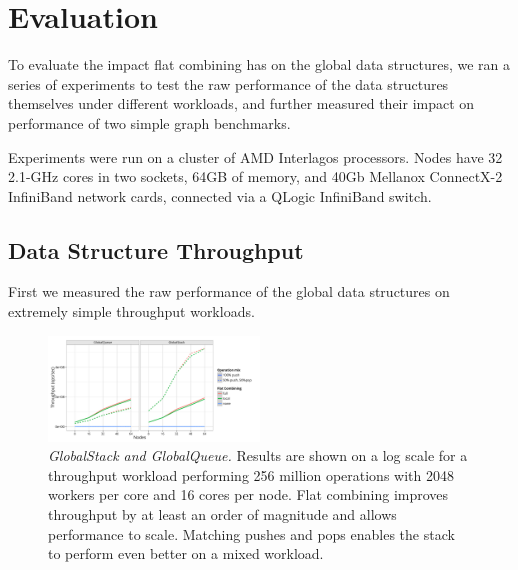 \section{Evaluation}
To evaluate the impact flat combining has on the global data structures, we ran a series of experiments to test the raw performance of the data structures themselves under different workloads, and further measured their impact on performance of two simple graph benchmarks.

Experiments were run on a cluster of AMD Interlagos processors. Nodes have 32 2.1-GHz cores in two sockets, 64GB of memory, and 40Gb Mellanox ConnectX-2 InfiniBand network cards, connected via a QLogic InfiniBand switch.

\subsection{Data Structure Throughput}
First we measured the raw performance of the global data structures on extremely simple throughput workloads.

\begin{figure}[t] %
  \centering
  \includegraphics[width=0.5\textwidth]{data/plots/vector_perf.pdf}
  \caption{\emph{GlobalStack and GlobalQueue.}
    Results are shown on a log scale for a throughput workload performing 256 million operations with 2048 workers per core and 16 cores per node. Flat combining improves throughput by at least an order of magnitude and allows performance to scale. Matching pushes and pops enables the stack to perform even better on a mixed workload.
  }
  \label{fig:vector}
\end{figure}
  
